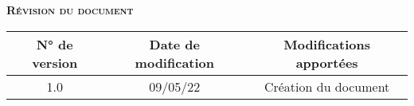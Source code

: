 \begin{center}
\textsc{\Large \textbf{Révision du document}}
\vspace{2cm}

\begin{tabular}{|c|c|c|}
    \hline
  N° de version & Date de modification & Modifications apportées  \\\hline
    1.0 & 09/05/22 & Création du document \\ \hline
\end{tabular}
\end{center}